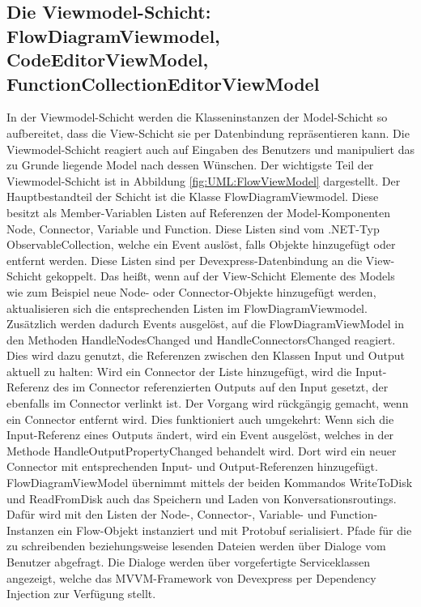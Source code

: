\subsection[Die Viewmodel-Schicht]{Die Viewmodel-Schicht: FlowDiagramViewmodel, CodeEditorViewModel, FunctionCollectionEditorViewModel}
\label{subsec:Die Viewmodel-Schicht}
In der Viewmodel-Schicht werden die Klasseninstanzen der Model-Schicht so aufbereitet, dass die View-Schicht sie per Datenbindung repräsentieren kann. Die Viewmodel-Schicht reagiert auch auf Eingaben des Benutzers und manipuliert das zu Grunde liegende Model nach dessen Wünschen. 
\newline
Der wichtigste Teil der Viewmodel-Schicht ist in Abbildung \ref{fig:UML:FlowViewModel} dargestellt. Der Hauptbestandteil der Schicht ist die Klasse FlowDiagramViewmodel. Diese besitzt als Member-Variablen Listen auf Referenzen der Model-Komponenten Node, Connector, Variable und Function. Diese Listen sind vom .NET-Typ ObservableCollection, welche ein Event auslöst, falls Objekte hinzugefügt oder entfernt werden. Diese Listen sind per Devexpress-Datenbindung an die View-Schicht gekoppelt. Das heißt, wenn auf der View-Schicht Elemente des Models wie zum Beispiel neue Node- oder Connector-Objekte hinzugefügt werden, aktualisieren sich die entsprechenden Listen im FlowDiagramViewmodel. Zusätzlich werden dadurch Events ausgelöst, auf die FlowDiagramViewModel in den Methoden HandleNodesChanged und HandleConnectorsChanged reagiert. Dies wird dazu genutzt, die Referenzen zwischen den Klassen Input und Output aktuell zu halten: Wird ein Connector der Liste hinzugefügt, wird die Input-Referenz des im Connector referenzierten Outputs auf den Input gesetzt, der ebenfalls im Connector verlinkt ist. Der Vorgang wird rückgängig gemacht, wenn ein Connector entfernt wird. Dies funktioniert auch umgekehrt: Wenn sich die Input-Referenz eines Outputs ändert, wird ein Event ausgelöst, welches in der Methode HandleOutputPropertyChanged behandelt wird. Dort wird ein neuer Connector mit entsprechenden Input- und Output-Referenzen hinzugefügt.
\newline 
FlowDiagramViewModel übernimmt mittels der beiden Kommandos WriteToDisk und ReadFromDisk auch das Speichern und Laden von Konversationsroutings. Dafür wird mit den Listen der Node-, Connector-, Variable- und Function-Instanzen ein Flow-Objekt instanziert und mit Protobuf serialisiert. Pfade für die zu schreibenden beziehungsweise lesenden Dateien werden über Dialoge vom Benutzer abgefragt. Die Dialoge werden über vorgefertigte Serviceklassen angezeigt, welche das MVVM-Framework von Devexpress per Dependency Injection zur Verfügung stellt. 
